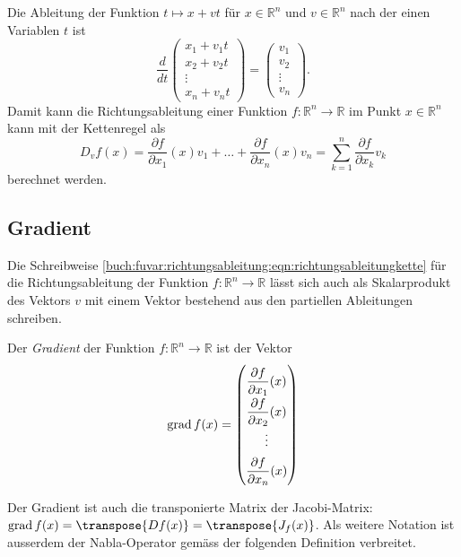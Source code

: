 Die Ableitung der Funktion $t\mapsto x+vt$ für $x\in\mathbb{R}^n$
und $v\in\mathbb{R}^n$ nach der einen Variablen $t$ ist
\[
\frac{d}{dt}
\begin{pmatrix}
x_1+v_1t\\
x_2+v_2t\\
\vdots  \\
x_n+v_nt
\end{pmatrix}
=
\begin{pmatrix}
v_1\\
v_2\\
\vdots\\
v_n
\end{pmatrix}.
\]
Damit kann die Richtungsableitung einer Funktion
$f\colon\mathbb{R}^n\to\mathbb{R}$
im Punkt $x\in\mathbb{R}^n$ kann mit der Kettenregel als
\begin{equation}
D_vf(x)
=
\frac{\partial f}{\partial x_1}(x) v_1
+
\dots
+
\frac{\partial f}{\partial x_n}(x) v_n
=
\sum_{k=1}^n \frac{\partial f}{\partial x_k} v_k
\label{buch:fuvar:richtungsableitung:eqn:richtungsableitungkette}
\end{equation}
berechnet werden.

%
%
\subsection{Gradient}
Die Schreibweise
\eqref{buch:fuvar:richtungsableitung:eqn:richtungsableitungkette}
für die Richtungsableitung der Funktion $f\colon\mathbb{R}^n\to\mathbb{R}$
lässt sich auch als Skalarprodukt des Vektors $v$ mit einem Vektor
bestehend aus den partiellen Ableitungen schreiben.

\begin{definition}
\label{buch:fuvar:richtungsableitung:def:gradient}
Der {\em Gradient} der Funktion $f\colon\mathbb{R}^n\to\mathbb{R}$ ist der
Vektor
\[
\operatorname{grad}f(x)
=
{
\renewcommand{\arraystretch}{1.9}
\begin{pmatrix}
\displaystyle
\frac{\partial f}{\partial x_1}(x)\\
\displaystyle
\frac{\partial f}{\partial x_2}(x)\\
\vdots \\
\displaystyle
\frac{\partial f}{\partial x_n}(x)
\end{pmatrix}
}
\]
\end{definition}

Der Gradient ist auch die transponierte Matrix der Jacobi-Matrix:
$\operatorname{grad}f(x) = \transpose{Df(x)} = \transpose{J_f(x)}$.
Als weitere Notation ist ausserdem der Nabla-Operator gemäss der folgenden
Definition verbreitet.


